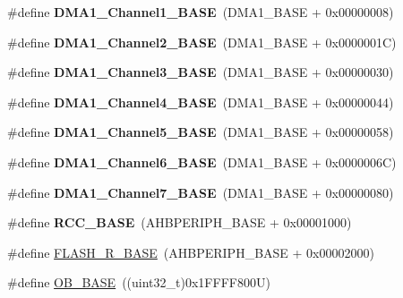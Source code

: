 \begin{DoxyCompactItemize}
\#define {\bfseries D\+M\+A1\+\_\+\+Channel1\+\_\+\+B\+A\+SE}~(D\+M\+A1\+\_\+\+B\+A\+SE + 0x00000008)
\item 
\mbox{\label{group___peripheral__memory__map_ga38a70090eef3687e83fa6ac0c6d22267}} 
\#define {\bfseries D\+M\+A1\+\_\+\+Channel2\+\_\+\+B\+A\+SE}~(D\+M\+A1\+\_\+\+B\+A\+SE + 0x0000001\+C)
\item 
\mbox{\label{group___peripheral__memory__map_ga70b3d9f36ca9ce95b4e421c11154fe5d}} 
\#define {\bfseries D\+M\+A1\+\_\+\+Channel3\+\_\+\+B\+A\+SE}~(D\+M\+A1\+\_\+\+B\+A\+SE + 0x00000030)
\item 
\mbox{\label{group___peripheral__memory__map_ga1adc93cd0baf0897202c71110e045692}} 
\#define {\bfseries D\+M\+A1\+\_\+\+Channel4\+\_\+\+B\+A\+SE}~(D\+M\+A1\+\_\+\+B\+A\+SE + 0x00000044)
\item 
\mbox{\label{group___peripheral__memory__map_gac041a71cd6c1973964f847a68aa14478}} 
\#define {\bfseries D\+M\+A1\+\_\+\+Channel5\+\_\+\+B\+A\+SE}~(D\+M\+A1\+\_\+\+B\+A\+SE + 0x00000058)
\item 
\mbox{\label{group___peripheral__memory__map_ga896c2c7585dd8bc3969cf8561f689d2d}} 
\#define {\bfseries D\+M\+A1\+\_\+\+Channel6\+\_\+\+B\+A\+SE}~(D\+M\+A1\+\_\+\+B\+A\+SE + 0x0000006\+C)
\item 
\mbox{\label{group___peripheral__memory__map_gaeee0d1f77d0db1db533016a09351166c}} 
\#define {\bfseries D\+M\+A1\+\_\+\+Channel7\+\_\+\+B\+A\+SE}~(D\+M\+A1\+\_\+\+B\+A\+SE + 0x00000080)
\item 
\mbox{\label{group___peripheral__memory__map_ga0e681b03f364532055d88f63fec0d99d}} 
\#define {\bfseries R\+C\+C\+\_\+\+B\+A\+SE}~(A\+H\+B\+P\+E\+R\+I\+P\+H\+\_\+\+B\+A\+SE + 0x00001000)
\item 
\#define \hyperlink{group___peripheral__memory__map_ga8e21f4845015730c5731763169ec0e9b}{F\+L\+A\+S\+H\+\_\+\+R\+\_\+\+B\+A\+SE}~(A\+H\+B\+P\+E\+R\+I\+P\+H\+\_\+\+B\+A\+SE + 0x00002000)
\item 
\#define \hyperlink{group___peripheral__memory__map_gab5b5fb155f9ee15dfb6d757da1adc926}{O\+B\+\_\+\+B\+A\+SE}~((uint32\+\_\+t)0x1\+F\+F\+F\+F800\+U)

\end{DoxyCompactItemize}
